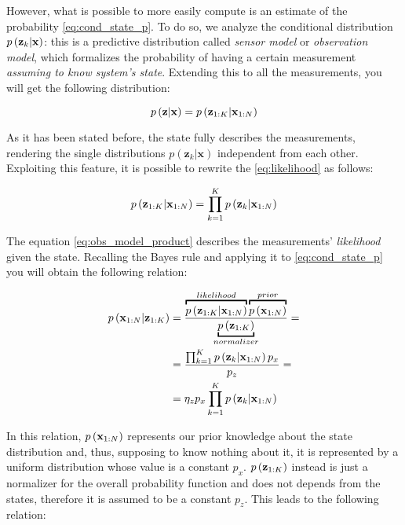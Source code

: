 However, what is possible to more easily compute is an estimate of the probability \ref{eq:cond_state_p}. To do so, we analyze the conditional distribution $p\left(\mathbf{z}_k | \mathbf{x}\right)$: this is a predictive distribution called \textit{sensor model} or \textit{observation model}, which formalizes the probability of having a certain measurement \textit{assuming to know system's state}. Extending this to all the measurements, you will get the following distribution:

\begin{equation}
    p\left(\mathbf{z} | \mathbf{x}\right) = p\left(\mathbf{z}_{1:K} | \mathbf{x}_{1:N}\right)
    \label{eq:likelihood}
\end{equation}

As it has been stated before, the state fully describes the measurements, rendering the single distributions $p\left(\mathbf{z}_k | \mathbf{x}\right)$ independent from each other. Exploiting this feature, it is possible to rewrite the \ref{eq:likelihood} as follows:

\begin{equation}
    \label{eq:obs_model_product}
    p\left(\mathbf{z}_{1:K} | \mathbf{x}_{1:N}\right) = 
        \prod_{k = 1}^{K} p\left(\mathbf{z}_k | \mathbf{x}_{1:N}\right)
\end{equation}

The equation \ref{eq:obs_model_product} describes the measurements' \textit{likelihood} given the state. Recalling the Bayes rule \cite{bayes-theorem} and applying it to \ref{eq:cond_state_p} you will obtain the following relation:

\begin{align*}
    p\left(\state_{1:N} | \meas_{1:K}\right) &= \frac{\overbracket{p\left(\meas_{1:K} | \state_{1:N}\right)}^{likelihood} \overbracket{p\left(\state_{1:N}\right)}^{prior}}{\underbracket{p\left(\meas_{1:K}\right)}_{normalizer}} = \\
    &= \frac{\prod_{k = 1}^{K} p\left(\meas_k | \state_{1:N}\right) p_x}{p_z} = \\
    &= \eta_{z} p_x \prod_{k = 1}^{K} p\left(\meas_k | \state_{1:N}\right)
\end{align*}

\noindent In this relation, $p\left(\mathbf{x}_{1:N}\right)$ represents our prior knowledge about the state distribution and, thus, supposing to know nothing about it, it is represented by a uniform distribution whose value is a constant $p_x$. $p\left(\mathbf{z}_{1:K}\right)$ instead is just a normalizer for the overall probability function and does not depends from the states, therefore it is assumed to be a constant $p_z$. This leads to the following relation:

